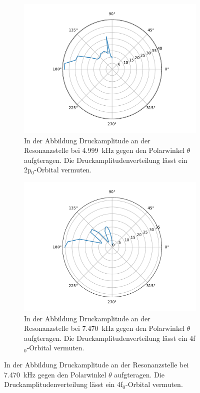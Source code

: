             \begin{figure}
                \centering
                \begin{subfigure}[b]{0.45\textwidth}
                    \centering
                    \includegraphics[scale=0.3]{./pictures/H_atom_resonanz_3_4999Hz.pdf}
                    \caption{In der Abbildung Druckamplitude an der Resonanzstelle bei \SI{4.999}{\kilo\hertz} gegen den Polarwinkel $\theta$ aufgteragen. Die Druckamplitudenverteilung lässt ein 2p$_0$-Orbital vermuten.}
                    \label{fig:H_atom_resonanz_3_4999Hz}
                \end{subfigure}
                \hfill
                \centering
                \begin{subfigure}[b]{0.45\textwidth}
                    \centering
                    \includegraphics[scale=0.3]{./pictures/H_atom_resonanz_4_7470Hz.pdf}
                    \caption{In der Abbildung Druckamplitude an der Resonanzstelle bei \SI{7.470}{\kilo\hertz} gegen den Polarwinkel $\theta$ aufgteragen. Die Druckamplitudenverteilung lässt ein 4f$_0$-Orbital vermuten.}
                    \label{fig:H_atom_resonanz_4_7470Hz}
                \end{subfigure}
            \end{figure}
              
